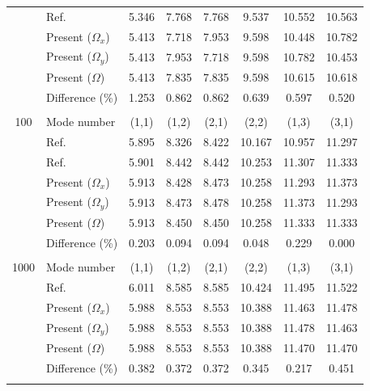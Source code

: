 \documentclass[preprint,12pt,number]{elsarticle}
\begin{document}
\begin{table}[!htbp]
{\begin{tabular}{c l c c c c c c}
	& Ref.\Citealp{zhang2019new}  & 5.346 & 7.768 & 7.768 & 9.537 & 10.552 & 10.563 \\
	& Present ($\Omega_x$)   & 5.413      & 7.718      & 7.953     & 9.598     & 10.448      & 10.782 \\
	& Present ($\Omega_y$)   & 5.413     & 7.953     & 7.718      & 9.598    & 10.782      & 10.453
	\\ 
	& Present ($\Omega$)   &5.413      & 7.835     & 7.835     & 9.598   &  10.615    & 10.618  \\
	&Difference (\%)& 1.253     & 0.862      & 0.862      & 0.639     &  0.597     & 0.520  \\
	\\
	100 & Mode number   &  (1,1) & (1,2) & (2,1) & (2,2) & (1,3) & (3,1) \\
	& Ref.\Citealp{mukhopadhyay1979free} & 5.895& 8.326 &8.422 &10.167 &10.957 &11.297 \\
	& Ref.\Citealp{zhang2019new} & 5.901 & 8.442 & 8.442 & 10.253 & 11.307 & 11.333 \\
	& Present ($\Omega_x$)   & 5.913     & 8.428      & 8.473    & 10.258     & 11.293      & 11.373 \\
	& Present ($\Omega_y$)   & 5.913    & 8.473     & 8.478    & 10.258     & 11.373     & 11.293
	\\ 
	& Present ($\Omega$)   & 5.913     & 8.450     & 8.450     & 10.258     &  11.333    & 11.333  \\
	&Difference (\%)& 0.203     & 0.094      & 0.094      & 0.048     & 0.229     & 0.000 \\
	\\
	1000 & Mode number   & (1,1) & (1,2) & (2,1) & (2,2) & (1,3) & (3,1) \\
	& Ref.\Citealp{zhang2019new} & 6.011 & 8.585 & 8.585 & 10.424 & 11.495 & 11.522 \\
	& Present ($\Omega_x$)   & 5.988     & 8.553      & 8.553      & 10.388      & 11.463      & 11.478 \\
	& Present ($\Omega_y$)   & 5.988     & 8.553     & 8.553    & 10.388      & 11.478       & 11.463
	\\ 
	& Present ($\Omega$)   & 5.988      & 8.553    & 8.553     & 10.388    &  11.470     & 11.470  \\
	&Difference (\%)& 0.382    & 0.372      & 0.372      & 0.345     &  0.217     & 0.451
	\\
	\\
	\bottomrule
\end{tabular}
}
\label{tab:rot1}
\end{table}
\end{document}
